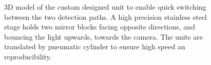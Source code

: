 \begin{figure}[htb]
\centering
\caption[Detection branch merging unit]{3D model of the custom designed unit to enable quick switching between the two detection paths. A high precision stainless steel stage holds two mirror blocks facing opposite directions, and bouncing the light upwards, towards the camera. The units are translated by  pneumatic cylinder to ensure high speed an reproducibility.}
\label{fig:DualMirror}
\end{figure}

